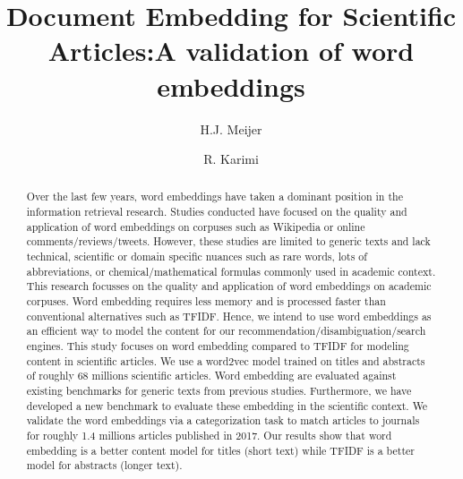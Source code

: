 \documentclass[runningheads]{llncs}
\begin{document}
\title{Document Embedding for Scientific Articles:\newline A validation of word embeddings}

\author{H.J. Meijer \and
R. Karimi}

\maketitle

\begin{abstract}
Over the last few years, word embeddings have taken a dominant position in the information retrieval research. Studies conducted have focused on the quality and application of word embeddings on corpuses such as Wikipedia or online comments/reviews/tweets. However, these studies are limited to generic texts and lack technical, scientific or domain specific nuances such as rare words, lots of abbreviations, or chemical/mathematical formulas commonly used in academic context. This research focusses on the quality and application of word embeddings on academic corpuses. Word embedding requires less memory and is processed faster than conventional alternatives such as TFIDF. Hence, we intend to use word embeddings as an efficient way to model the content for our recommendation/disambiguation/search engines. This study focuses on word embedding compared to TFIDF for modeling content in scientific articles. We use a word2vec model  trained on titles and abstracts of roughly 68 millions scientific articles. Word embedding are evaluated against existing benchmarks for generic texts from previous studies. Furthermore, we have developed a new benchmark to evaluate these embedding in the scientific context. We validate the word embeddings via a categorization task to match articles to journals for roughly 1.4 millions articles published in 2017. Our results show that word embedding is a better content model for titles (short text) while TFIDF is a better model for abstracts (longer text).
\end{abstract}
\end{document}
